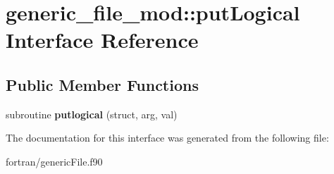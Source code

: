 \hypertarget{interfacegeneric__file__mod_1_1put_logical}{}\section{generic\+\_\+file\+\_\+mod\+:\+:put\+Logical Interface Reference}
\label{interfacegeneric__file__mod_1_1put_logical}
\subsection*{Public Member Functions}
\begin{DoxyCompactItemize}
\item 
\mbox{\label{interfacegeneric__file__mod_1_1put_logical_a20ada410a8186d8b2e4f7b2d8491286c}} 
subroutine {\bfseries putlogical} (struct, arg, val)
\end{DoxyCompactItemize}


The documentation for this interface was generated from the following file\+:\begin{DoxyCompactItemize}
\item 
fortran/generic\+File.\+f90\end{DoxyCompactItemize}

